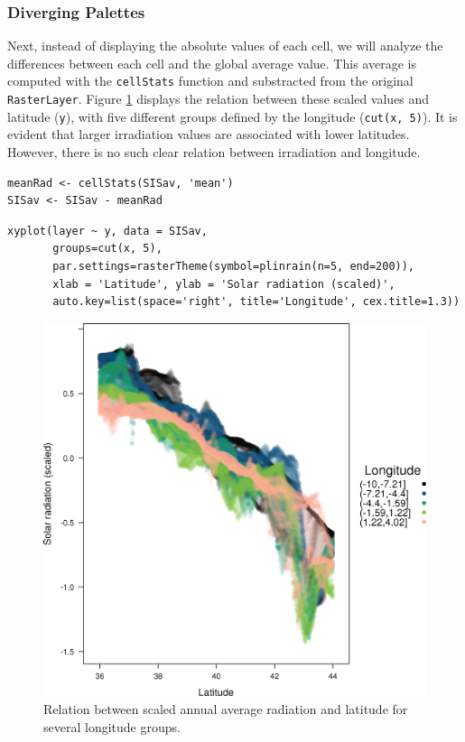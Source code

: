 \subsubsection{Diverging Palettes}
\label{sec-1-1-3}
Next, instead of displaying the absolute values of each cell, we will
analyze the differences between each cell and the global average
value. This average is computed with the \texttt{cellStats} function and
substracted from the original \texttt{RasterLayer}. Figure
\ref{fig:xyplotSISav} displays the relation between these scaled
values and latitude (\texttt{y}), with five different groups defined by the
longitude (\texttt{cut(x, 5)}). It is evident that larger irradiation values
are associated with lower latitudes. However, there is no such clear
relation between irradiation and longitude.


\lstset{language=R,numbers=none}
\begin{lstlisting}
meanRad <- cellStats(SISav, 'mean')
SISav <- SISav - meanRad
\end{lstlisting}


\lstset{language=R,numbers=none}
\begin{lstlisting}
xyplot(layer ~ y, data = SISav,
       groups=cut(x, 5),
       par.settings=rasterTheme(symbol=plinrain(n=5, end=200)),
       xlab = 'Latitude', ylab = 'Solar radiation (scaled)',  
       auto.key=list(space='right', title='Longitude', cex.title=1.3))
\end{lstlisting}

\begin{figure}[htb]
\centering
\includegraphics[width=.9\linewidth]{figs/xyplotSISav.png}
\caption{\label{fig:xyplotSISav}Relation between scaled annual average radiation and latitude for several longitude groups.}
\end{figure}

